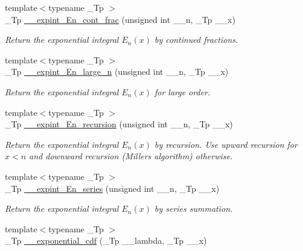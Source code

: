 \begin{DoxyCompactItemize}
{\footnotesize template$<$typename \+\_\+\+Tp $>$ }\\\+\_\+\+Tp \hyperlink{namespacestd_1_1____detail_a34e1eb1248cdad9ceed2aa33732de6ea}{\+\_\+\+\_\+expint\+\_\+\+En\+\_\+cont\+\_\+frac} (unsigned int \+\_\+\+\_\+n, \+\_\+\+Tp \+\_\+\+\_\+x)
\begin{DoxyCompactList}\small\item\em Return the exponential integral $ E_n(x) $ by continued fractions. \end{DoxyCompactList}\item 
{\footnotesize template$<$typename \+\_\+\+Tp $>$ }\\\+\_\+\+Tp \hyperlink{namespacestd_1_1____detail_a77400748c1315de9be10fa5e469df64b}{\+\_\+\+\_\+expint\+\_\+\+En\+\_\+large\+\_\+n} (unsigned int \+\_\+\+\_\+n, \+\_\+\+Tp \+\_\+\+\_\+x)
\begin{DoxyCompactList}\small\item\em Return the exponential integral $ E_n(x) $ for large order. \end{DoxyCompactList}\item 
{\footnotesize template$<$typename \+\_\+\+Tp $>$ }\\\+\_\+\+Tp \hyperlink{namespacestd_1_1____detail_a9b0a2050324390fb6c4a584170289a99}{\+\_\+\+\_\+expint\+\_\+\+En\+\_\+recursion} (unsigned int \+\_\+\+\_\+n, \+\_\+\+Tp \+\_\+\+\_\+x)
\begin{DoxyCompactList}\small\item\em Return the exponential integral $ E_n(x) $ by recursion. Use upward recursion for $ x < n $ and downward recursion (Miller\textquotesingle{}s algorithm) otherwise. \end{DoxyCompactList}\item 
{\footnotesize template$<$typename \+\_\+\+Tp $>$ }\\\+\_\+\+Tp \hyperlink{namespacestd_1_1____detail_a5c51269e411cd82ffec2e63212f76b41}{\+\_\+\+\_\+expint\+\_\+\+En\+\_\+series} (unsigned int \+\_\+\+\_\+n, \+\_\+\+Tp \+\_\+\+\_\+x)
\begin{DoxyCompactList}\small\item\em Return the exponential integral $ E_n(x) $ by series summation. \end{DoxyCompactList}\item 
{\footnotesize template$<$typename \+\_\+\+Tp $>$ }\\\+\_\+\+Tp \hyperlink{namespacestd_1_1____detail_ada7f806f891a02d7825ec9a8862302ad}{\+\_\+\+\_\+exponential\+\_\+cdf} (\+\_\+\+Tp \+\_\+\+\_\+lambda, \+\_\+\+Tp \+\_\+\+\_\+x)

\end{DoxyCompactItemize}
